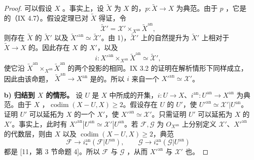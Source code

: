 \begin{proof}
可以假设 $X$ 。事实上，设 $\widetilde X$ 为 $X$ 的，$p:\widetilde X\to X$ 为典范。由于 $p$ ，它是的（IX 4.7）。假设定理已对 $\widetilde X$ 得证，令
\[
\widetilde{\mathcal X}'=\mathcal X'\times_{X^{\mathrm{an}}}\widetilde X^{\mathrm{an}},
\]
则存在 $\widetilde X$ 的 $\widetilde X'$ 以及 $\widetilde X'^{\mathrm{an}}\simeq\widetilde{\mathcal X}'$。由 1)，$\widetilde{\mathcal X}'$ 上的自然提升为 $\widetilde X'$ 上相对于 $\widetilde X\to X$ 的。因此存在 $X$ 的 $X'$，以及
\[
i:X'^{\mathrm{an}}\times_{X^{\mathrm{an}}}\widetilde X^{\mathrm{an}}\simeq\widetilde{\mathcal X}',
\]
使它沿 $\widetilde X^{\mathrm{an}}\times_{X^{\mathrm{an}}}\widetilde X^{\mathrm{an}}$ 的两个投影的相同。IX 3.2 的证明在解析情形下同样成立，因此由该命题， $\widetilde X^{\mathrm{an}}\to X^{\mathrm{an}}$ 是的。所以 $i$ 来自一个 $X'^{\mathrm{an}}\simeq\mathcal X'$。

\textbf{b) 归结到 $X$ 的情形。} 设 $U$ 是 $X$ 中所成的开集，$i:U\to X$、$i^{\mathrm{an}}:U^{\mathrm{an}}\to X^{\mathrm{an}}$ 为典范。由于 $X$ ，$\operatorname{codim}(X-U,X)\geq2$。假设存在 $U$ 的 $U'$，使 $U'^{\mathrm{an}}\simeq\mathcal X'|U^{\mathrm{an}}$。证明 $U'$ 可以延拓为 $X$ 的一个 $X'$，使 $X'^{\mathrm{an}}\simeq\mathcal X'$。只需证明 $U'$ 可以延拓为 $X$ 的 $X'$。事实上，此时有 $X'^{\mathrm{an}}|U^{\mathrm{an}}\simeq\mathcal X'|U^{\mathrm{an}}$。若 $\mathcal F,\mathcal G$ 为 $O_{X^{\mathrm{an}}}$ 上分别定义 $\mathcal X'$、$X'^{\mathrm{an}}$ 的代数层，则由 $X$ 以及 $\operatorname{codim}(X-U,X)\geq2$，典范
\[
\mathcal F\longrightarrow i_*^{\mathrm{an}}(\mathcal F|U^{\mathrm{an}}),\qquad
\mathcal G\longrightarrow i_*^{\mathrm{an}}(\mathcal G|U^{\mathrm{an}})
\]
都是 [11，第 3 节命题 4]。所以 $\mathcal F$ 与 $\mathcal G$ ，从而 $X'^{\mathrm{an}}$ 与 $\mathcal X'$ 也。


\end{proof}
